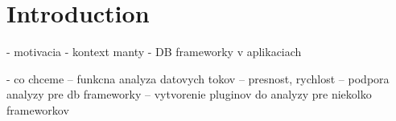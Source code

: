
\chapter*{Introduction}

- motivacia
- kontext manty
- DB frameworky v aplikaciach

- co chceme
-- funkcna analyza datovych tokov
-- presnost, rychlost
-- podpora analyzy pre db frameworky
-- vytvorenie pluginov do analyzy pre niekolko frameworkov

